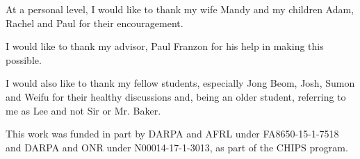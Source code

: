 \begin{acknowledgements}
At a personal level, I would like to thank my wife Mandy and my children Adam, Rachel and Paul for their encouragement.

I would like to thank my advisor, Paul Franzon for his help in making this possible.

I would also like to thank my fellow students, especially Jong Beom, Josh, Sumon and Weifu for their healthy discussions and, being an older student, referring to me as Lee and not Sir or Mr. Baker.

This work was funded in part by DARPA and AFRL under FA8650-15-1-7518 and DARPA and ONR under N00014-17-1-3013, as part of the CHIPS program.
\end{acknowledgements}


\iftrue

\thesistableofcontents

\thesislistoftables

\thesislistoffigures

\fi
